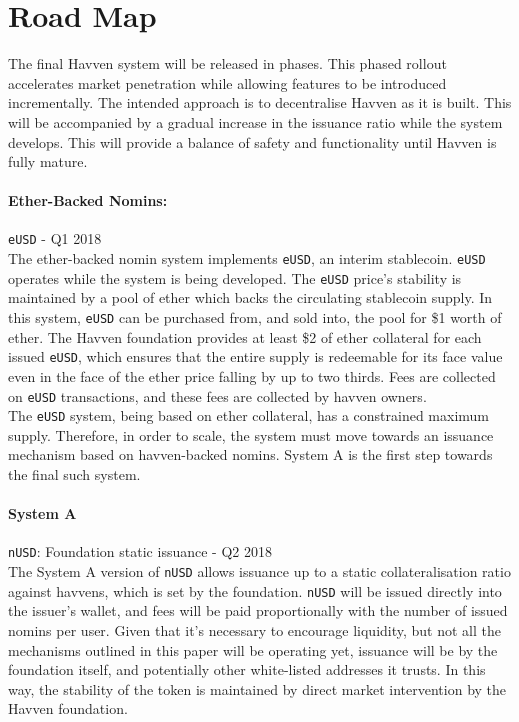 \section{Road Map}

The final Havven system will be released in phases. This phased rollout 
accelerates market penetration while allowing
features to be introduced incrementally. The intended approach  
is to decentralise Havven as it is built. This will be accompanied by a gradual
increase in the issuance ratio while the system develops.
This will provide a balance of safety and functionality until Havven is fully mature.

\paragraph{Ether-Backed Nomins:} \texttt{eUSD} - Q1 2018 \\

\noindent The ether-backed nomin system implements \texttt{eUSD}, an interim stablecoin.
\texttt{eUSD} operates while the system is being developed.
The \texttt{eUSD} price's stability is maintained by a pool of ether which
backs the circulating stablecoin supply. In this system, \texttt{eUSD} can be
purchased from, and sold into, the pool for \$1 worth of ether.
The Havven foundation provides at least \$2 of ether collateral for each
issued \texttt{eUSD}, which ensures that the entire supply is redeemable for its
face value even in the face of the ether price falling by up to two thirds.
Fees are collected on \texttt{eUSD} transactions, and these fees are collected
by havven owners. \\

\noindent The \texttt{eUSD} system, being based on ether collateral, has a constrained maximum supply.
Therefore, in order to scale, the system must move towards an issuance mechanism based on havven-backed
nomins. System A is the first step towards the final such system.


\paragraph{System A} \texttt{nUSD}: Foundation static issuance - Q2 2018 \\

\noindent The System A version of \texttt{nUSD} allows issuance up to a static
collateralisation ratio against havvens, which is set by the foundation.
\texttt{nUSD} will be issued directly into the issuer's wallet, and fees will be paid
proportionally with the number of issued nomins per user. Given that it's necessary to
encourage liquidity, but not all the mechanisms outlined in this paper will be operating
yet, issuance will be by the foundation itself, and potentially other white-listed
addresses it trusts. In this way, the stability of the token is maintained by direct
market intervention by the Havven foundation. \\

